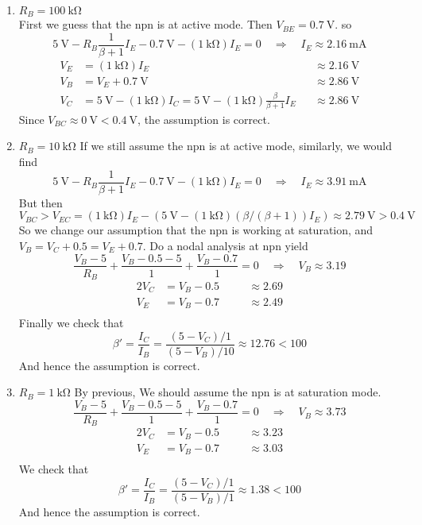 \documentclass[12pt, a4paper]{article}
\begin{document}
\Ans \\
\begin{enumerate}[1.]
  \item $R_B = \SI{100}{\kohm}$ \\
    First we guess that the npn is at active mode. Then $V_{BE} = \SI{0.7}{\V}$. so
    \[
    \SI{5}{\V} - R_B \frac{1}{\beta+1} I_E - \SI{0.7}{\V} - (\SI{1}{\kohm}) I_E = 0 \quad \Rightarrow \quad I_E \approx \SI{2.16}{\mA} \]
    \begin{align*}
      V_E &= (\SI{1}\kohm) I_E && \approx \SI{2.16}{\V} \\
      V_B &= V_E + \SI{0.7}\V && \approx \SI{2.86}\V \\
      V_C &= \SI{5}\V - (\SI{1}\kohm) I_C = \SI{5}{\V} - (\SI{1}\kohm) \frac{\beta}{\beta+1} I_E && \approx \SI{2.86}\V
    \end{align*}
    Since $V_{BC} \approx \SI{0}{\V} < \SI{0.4}\V$, the assumption is correct.
  \item $R_B = \SI{10}\kohm$
    If we still assume the npn is at active mode, similarly, we would find
    \[
    \SI{5}{\V} - R_B \frac{1}{\beta+1} I_E - \SI{0.7}{\V} - (\SI{1}{\kohm}) I_E = 0 \quad \Rightarrow \quad I_E \approx \SI{3.91}{\mA} \]
    But then 
    \[ V_{BC} > V_{EC} = ( \SI{1}\kohm ) I_E - (\SI{5}\V - (\SI{1}\kohm) (\beta/(\beta+1)) I_E) \approx \SI{2.79}\V > \SI{0.4}{\V} \]
    So we change our assumption that the npn is working at saturation, and $V_B = V_C + 0.5 = V_E + 0.7$. Do a nodal analysis at npn yield
    \[ \frac{V_B - 5}{ R_B } + \frac{V_B - 0.5 - 5}{1} + \frac{V_B - 0.7}{1} = 0 \quad \Rightarrow \quad V_B \approx 3.19 \]
    \begin{alignat*}{2}
      V_C &= V_B - 0.5 && \quad \approx 2.69 \\
      V_E &= V_B - 0.7 && \quad \approx 2.49 \\
    \end{alignat*}
    Finally we check that 
    \[
    \beta' = \frac{I_C}{I_B} = \frac{(5 - V_C) / 1}{(5 - V_B) / 10} \approx 12.76 < 100 \]
    And hence the assumption is correct.
  \item $R_B = \SI{1}\kohm$
    By previous, We should assume the npn is at saturation mode.
    \[ \frac{V_B - 5}{ R_B } + \frac{V_B - 0.5 - 5}{1} + \frac{V_B - 0.7}{1} = 0 \quad \Rightarrow \quad V_B \approx 3.73 \]
    \begin{alignat*}{2}
      V_C &= V_B - 0.5 && \quad \approx 3.23 \\
      V_E &= V_B - 0.7 && \quad \approx 3.03 \\
    \end{alignat*}
    We check that 
    \[
    \beta' = \frac{I_C}{I_B} = \frac{(5 - V_C) / 1}{(5 - V_B) / 1} \approx 1.38 < 100 \]
    And hence the assumption is correct.
\end{enumerate}
\end{document}
